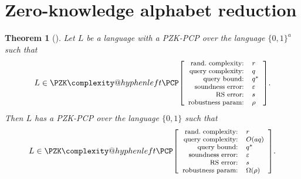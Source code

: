 \documentclass[english,12pt]{reedthesis}
\makeatletter
\theoremstyle{plain}
\newtheorem{thm}{Theorem}[section]
\theoremstyle{definition}
\theoremstyle{remark}
\newcommand{\pzkpcpr}[6]{%
  \ensuremath%
  \mleft[{\footnotesize\begin{array}{r l}
    \text{rand.\ complexity:} & #1 \\
    \text{query complexity:} & #2 \\
    \text{query bound:} & #3 \\
    \text{soundness error:} & #4 \\
    \text{RS error:} & #5 \\
    \text{robustness param:} & #6
  \end{array}}\mright]%
}
\newcommand{\PZKPCP}{%
  \PZK\complexity@hyphenleft\PCP
}
\makeatother
\begin{document}
\section{Zero-knowledge alphabet reduction}\label{sec:zk-alph-red}


\begin{thm}[{\cite[Lemma 2.13]{BGHSV06}}]%
  \label{thm:zk-alph-red}\label{alphabet reduction!zero-knowledge}
  Let $L$ be a language with a PZK-PCP over the language $\{0, 1\}^{a}$ such
  that
  \[
    L \in \PZKPCP\pzkpcpr{r}{q}{q^{*}}{\varepsilon}{s}{\rho}.
  \]
  Then $L$ has a PZK-PCP over the language $\{0, 1\}$ such that
  \[
    L \in \PZKPCP\pzkpcpr{r}{O(aq)}{q^{*}}{\varepsilon}{s}{\Omega(\rho)}.
  \]
\end{thm}
\end{document}
